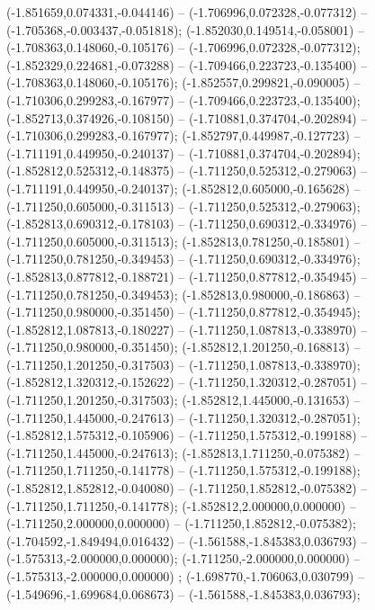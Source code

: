  (-1.851659,0.074331,-0.044146) -- (-1.706996,0.072328,-0.077312) -- (-1.705368,-0.003437,-0.051818);
 (-1.852030,0.149514,-0.058001) -- (-1.708363,0.148060,-0.105176) -- (-1.706996,0.072328,-0.077312);
 (-1.852329,0.224681,-0.073288) -- (-1.709466,0.223723,-0.135400) -- (-1.708363,0.148060,-0.105176);
 (-1.852557,0.299821,-0.090005) -- (-1.710306,0.299283,-0.167977) -- (-1.709466,0.223723,-0.135400);
 (-1.852713,0.374926,-0.108150) -- (-1.710881,0.374704,-0.202894) -- (-1.710306,0.299283,-0.167977);
 (-1.852797,0.449987,-0.127723) -- (-1.711191,0.449950,-0.240137) -- (-1.710881,0.374704,-0.202894);
 (-1.852812,0.525312,-0.148375) -- (-1.711250,0.525312,-0.279063) -- (-1.711191,0.449950,-0.240137);
 (-1.852812,0.605000,-0.165628) -- (-1.711250,0.605000,-0.311513) -- (-1.711250,0.525312,-0.279063);
 (-1.852813,0.690312,-0.178103) -- (-1.711250,0.690312,-0.334976) -- (-1.711250,0.605000,-0.311513);
 (-1.852813,0.781250,-0.185801) -- (-1.711250,0.781250,-0.349453) -- (-1.711250,0.690312,-0.334976);
 (-1.852813,0.877812,-0.188721) -- (-1.711250,0.877812,-0.354945) -- (-1.711250,0.781250,-0.349453);
 (-1.852813,0.980000,-0.186863) -- (-1.711250,0.980000,-0.351450) -- (-1.711250,0.877812,-0.354945);
 (-1.852812,1.087813,-0.180227) -- (-1.711250,1.087813,-0.338970) -- (-1.711250,0.980000,-0.351450);
 (-1.852812,1.201250,-0.168813) -- (-1.711250,1.201250,-0.317503) -- (-1.711250,1.087813,-0.338970);
 (-1.852812,1.320312,-0.152622) -- (-1.711250,1.320312,-0.287051) -- (-1.711250,1.201250,-0.317503);
 (-1.852812,1.445000,-0.131653) -- (-1.711250,1.445000,-0.247613) -- (-1.711250,1.320312,-0.287051);
 (-1.852812,1.575312,-0.105906) -- (-1.711250,1.575312,-0.199188) -- (-1.711250,1.445000,-0.247613);
 (-1.852813,1.711250,-0.075382) -- (-1.711250,1.711250,-0.141778) -- (-1.711250,1.575312,-0.199188);
 (-1.852812,1.852812,-0.040080) -- (-1.711250,1.852812,-0.075382) -- (-1.711250,1.711250,-0.141778);
 (-1.852812,2.000000,0.000000) -- (-1.711250,2.000000,0.000000) -- (-1.711250,1.852812,-0.075382);
 (-1.704592,-1.849494,0.016432) -- (-1.561588,-1.845383,0.036793) -- (-1.575313,-2.000000,0.000000);
 (-1.711250,-2.000000,0.000000) -- (-1.575313,-2.000000,0.000000) ;
 (-1.698770,-1.706063,0.030799) -- (-1.549696,-1.699684,0.068673) -- (-1.561588,-1.845383,0.036793);
